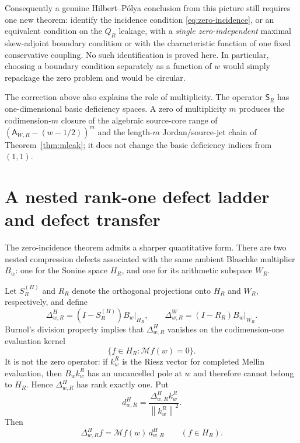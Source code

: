 \documentclass[11pt]{article}
\theoremstyle{remark}
\newcommand{\norm}[1]{\left\lVert #1\right\rVert}
\begin{document}
Consequently a genuine Hilbert--P\'olya conclusion from this picture still requires one new theorem: identify the incidence condition \eqref{eq:zero-incidence}, or an equivalent condition on the $Q_R$ leakage, with a \emph{single zero-independent} maximal skew-adjoint boundary condition or with the characteristic function of one fixed conservative coupling.  No such identification is proved here.  In particular, choosing a boundary condition separately as a function of $w$ would simply repackage the zero problem and would be circular.

The correction above also explains the role of multiplicity.  The operator $\mathsf S_R$ has one-dimensional basic deficiency spaces.  A zero of multiplicity $m$ produces the codimension-$m$ closure of the algebraic source-core range of $(\mathsf A_{W,R}-(w-1/2))^m$ and the length-$m$ Jordan/source-jet chain of Theorem~\ref{thm:mleak}; it does not change the basic deficiency indices from $(1,1)$.


\section{A nested rank-one defect ladder and defect transfer}
The zero-incidence theorem admits a sharper quantitative form.  There are two nested compression defects associated with the same ambient Blaschke multiplier $B_w$: one for the Sonine space $H_R$, and one for its arithmetic subspace $W_R$.

Let $S_R^{(H)}$ and $R_R$ denote the orthogonal projections onto $H_R$ and $W_R$, respectively, and define
\[
 \Delta^{H}_{w,R}=(I-S_R^{(H)})B_w\big|_{H_R},
 \qquad
 \Delta^{W}_{w,R}=(I-R_R)B_w\big|_{W_R}.
\]
Burnol's division property implies that $\Delta^H_{w,R}$ vanishes on the codimension-one evaluation kernel
\[
 \{f\in H_R:\mathcal M f(w)=0\}.
\]
It is not the zero operator: if $k_w^R$ is the Riesz vector for completed Mellin evaluation, then $B_wk_w^R$ has an uncancelled pole at $w$ and therefore cannot belong to $H_R$.  Hence $\Delta^H_{w,R}$ has rank exactly one.  Put
\[
 d^H_{w,R}=\frac{\Delta^H_{w,R}k_w^R}{\norm{k_w^R}^2}.
\]
Then
\begin{equation}\label{eq:H-defect-factor}
 \boxed{\Delta^H_{w,R}f=\mathcal M f(w)\,d^H_{w,R}\qquad(f\in H_R).}
\end{equation}
\end{document}
